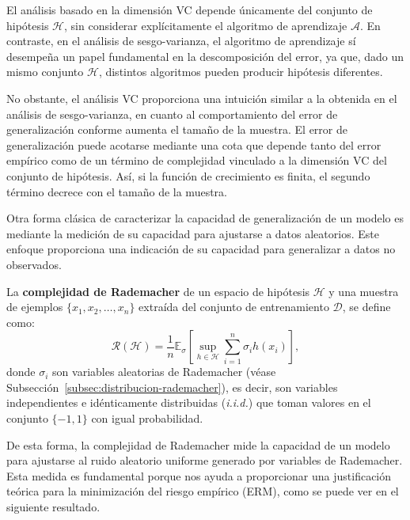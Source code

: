 \begin{observacion}
    El análisis basado en la dimensión VC depende únicamente del conjunto de hipótesis $\mathcal{H}$, sin considerar explícitamente el algoritmo de aprendizaje $\mathcal{A}$. En contraste, en el análisis de sesgo-varianza, el algoritmo de aprendizaje sí desempeña un papel fundamental en la descomposición del error, ya que, dado un mismo conjunto $\mathcal{H}$, distintos algoritmos pueden producir hipótesis diferentes.
\end{observacion}

No obstante, el análisis VC proporciona una intuición similar a la obtenida en el análisis de sesgo-varianza, en cuanto al comportamiento del error de generalización conforme aumenta el tamaño de la muestra. El error de generalización puede acotarse mediante una cota que depende tanto del error empírico como de un término de complejidad vinculado a la dimensión VC del conjunto de hipótesis. Así, si la función de crecimiento es finita, el segundo término decrece con el tamaño de la muestra.

Otra forma clásica de caracterizar la capacidad de generalización de un modelo es mediante la medición de su capacidad para ajustarse a datos aleatorios. Este enfoque proporciona una indicación de su capacidad para generalizar a datos no observados.

\begin{definicion}
    La \textbf{complejidad de Rademacher} de un espacio de hipótesis $ \mathcal{H} $ y una muestra de ejemplos $ \{ x_1, x_2, \dots, x_n \} $ extraída del conjunto de entrenamiento $ \mathcal{D} $, se define como:
    \[
        \mathcal{R}(\mathcal{H}) = \frac{1}{n} \mathbb{E}_{\sigma} \left[ \sup_{h \in \mathcal{H}} \sum_{i=1}^n \sigma_i h(x_i) \right],
    \]
    donde $ \sigma_i $ son variables aleatorias de Rademacher (véase Subsección~\ref{subsec:distribucion-rademacher}), es decir, son variables independientes e idénticamente distribuidas (\textit{i.i.d.}) que toman valores en el conjunto $ \{-1, 1\} $ con igual probabilidad.
\end{definicion}

De esta forma, la complejidad de Rademacher mide la capacidad de un modelo para ajustarse al ruido aleatorio uniforme generado por variables de Rademacher. Esta medida es fundamental porque nos ayuda a proporcionar una justificación teórica para la minimización del riesgo empírico (ERM), como se puede ver en el siguiente resultado.

